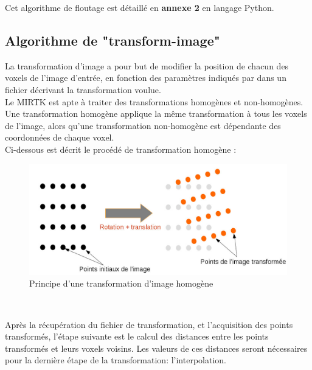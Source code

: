 \documentclass[10pt]{report}
\begin{document}
	Cet algorithme de floutage est détaillé en \textbf{annexe 2} en langage Python.
	\newpage
	\subsection{Algorithme de "transform-image"} 
	La transformation d'image a pour but de modifier la position de chacun des voxels de l'image d'entrée, en fonction des paramètres indiqués par dans un fichier décrivant la transformation voulue.\\
	Le MIRTK est apte à traiter des transformations homogènes et non-homogènes. Une transformation homogène applique la même transformation à tous les voxels de l'image, alors qu'une transformation non-homogène est dépendante des coordonnées de chaque voxel.  \\
	Ci-dessous est décrit le procédé de transformation homogène :
	\begin{figure}[h!]
		\begin{center}
			\includegraphics[width=14cm]{transform_trans_rot.jpg}
		\end{center}
		\caption{Principe d'une transformation d'image homogène}
		\label{Principe d'une transformation d'image homogène}
	\end{figure} ~\par
	
	Après la récupération du fichier de transformation, et l'acquisition des points transformés, l'étape suivante est le calcul des distances entre les points transformés et leurs voxels voisins. Les valeurs de ces distances seront nécessaires pour la dernière étape de la transformation: l'interpolation.
	
\end{document}
